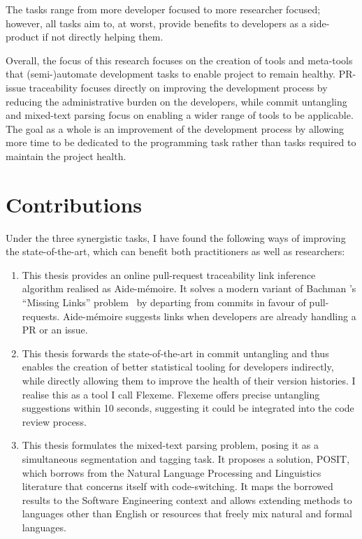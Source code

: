 The tasks range from more developer focused to more researcher focused; however,
all tasks aim to, at worst, provide benefits to developers as a side-product if
not directly helping them.

Overall, the focus of this research focuses on the creation of tools and
meta-tools that (semi-)automate development tasks to enable project to remain
healthy. PR-issue traceability focuses directly on improving the development
process by reducing the administrative burden on the developers, while commit
untangling and mixed-text parsing focus on enabling a wider range of tools to be
applicable. The goal as a whole is an improvement of the development process by
allowing more time to be dedicated to the programming task rather than tasks
required to maintain the project health.

\section{Contributions}
\label{chapter:introduction:sec:contrib}

Under the three synergistic tasks, I have found the following ways of improving
the state-of-the-art, which can benefit both practitioners as well as
researchers:

\begin{enumerate}
    \item This thesis provides an online pull-request traceability link
    inference algorithm realised as Aide-mémoire. It solves a modern variant of
    Bachman \etal’s ``Missing Links'' problem~\cite{MissingLinks} by departing
    from commits in favour of pull-requests. Aide-mémoire suggests links when
    developers are already handling a PR or an issue.
    \item This thesis forwards the state-of-the-art in commit
    untangling and thus enables the creation of better statistical tooling for
    developers indirectly, while directly allowing them to improve the health of
    their version histories. I realise this as a tool I call Flexeme. Flexeme
    offers precise untangling suggestions within 10 seconds, suggesting it could
    be integrated into the code review process.
    \item This thesis formulates the mixed-text parsing problem, posing it as a
    simultaneous segmentation and tagging task. It proposes a solution, POSIT,
    which borrows from the Natural Language Processing and Linguistics
    literature that concerns itself with code-switching. It maps the borrowed
    results to the Software Engineering context and allows extending methods to
    languages other than English or resources that freely mix natural and formal
    languages.
\end{enumerate}

